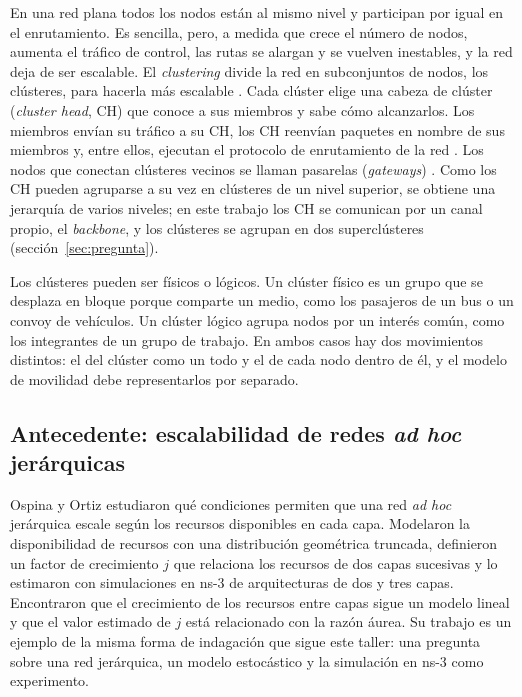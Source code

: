 En una red plana todos los nodos están al mismo nivel y participan por igual en el
enrutamiento. Es sencilla, pero, a medida que crece el número de nodos, aumenta el
tráfico de control, las rutas se alargan y se vuelven inestables, y la red deja de ser
escalable. El \emph{clustering} divide la red en subconjuntos de nodos, los clústeres,
para hacerla más escalable \cite{barbeau2007principles}. Cada clúster elige una cabeza
de clúster (\emph{cluster head}, CH) que conoce a sus miembros y sabe cómo alcanzarlos.
Los miembros envían su tráfico a su CH, los CH reenvían paquetes en nombre de sus
miembros y, entre ellos, ejecutan el protocolo de enrutamiento de la red
\cite{barbeau2007principles}. Los nodos que conectan clústeres vecinos se llaman
pasarelas (\emph{gateways}) \cite{sarkar2013adhoc}. Como los CH pueden agruparse a su vez
en clústeres de un nivel superior, se obtiene una jerarquía de varios niveles; en este
trabajo los CH se comunican por un canal propio, el \emph{backbone}, y los clústeres se
agrupan en dos superclústeres (sección~\ref{sec:pregunta}).

Los clústeres pueden ser físicos o lógicos. Un clúster físico es un grupo que se
desplaza en bloque porque comparte un medio, como los pasajeros de un bus o un convoy de
vehículos. Un clúster lógico agrupa nodos por un interés común, como los integrantes de
un grupo de trabajo. En ambos casos hay dos movimientos distintos: el del clúster como
un todo y el de cada nodo dentro de él, y el modelo de movilidad debe representarlos por
separado.

\subsection{Antecedente: escalabilidad de redes \emph{ad hoc} jerárquicas}
\label{sec:marco-ospina}

Ospina y Ortiz \cite{ospina2017growth} estudiaron qué condiciones permiten que una red
\emph{ad hoc} jerárquica escale según los recursos disponibles en cada capa. Modelaron
la disponibilidad de recursos con una distribución geométrica truncada, definieron un
factor de crecimiento $j$ que relaciona los recursos de dos capas sucesivas y lo
estimaron con simulaciones en ns-3 de arquitecturas de dos y tres capas. Encontraron que
el crecimiento de los recursos entre capas sigue un modelo lineal y que el valor
estimado de $j$ está relacionado con la razón áurea. Su trabajo es un ejemplo de la
misma forma de indagación que sigue este taller: una pregunta sobre una red jerárquica,
un modelo estocástico y la simulación en ns-3 como experimento.

